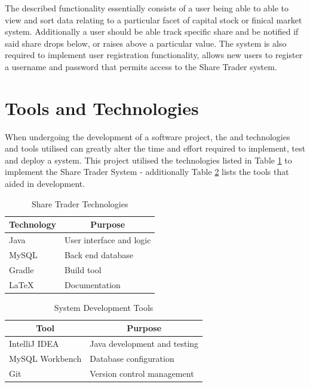 \documentclass[12pt, a4paper,titlepage]{article}
\begin{document}
The described functionality essentially consists of a user being able to
able to view and sort data relating to a particular facet of
capital stock or finical market system.
Additionally a user should be able track specific share and be notified if said
share drops below, or raises above a particular value.
The system is also required to implement user registration functionality,
allows new users to register a username and password that permits access to
the Share Trader system.


\section{Tools and Technologies}
When undergoing the development of a software project, the and technologies
and tools utilised can greatly alter the time and effort required to
implement, test and deploy a system.
This project utilised the technologies listed in Table \ref{table-tech} to
implement the Share Trader System - additionally Table \ref{table-tool} lists
the tools that aided in development.

\begin{table}[h]
    \centering
    \begin{tabular}{|l|l|}
        \hline
        \textbf{Technology}  & \multicolumn{1}{c|}{\textbf{Purpose}} \\ \hline
        Java        & User interface and logic     \\ \hline
        MySQL       & Back end database            \\ \hline
        Gradle      & Build tool                   \\ \hline
        \LaTeX      & Documentation                \\ \hline
    \end{tabular}
    \caption{Share Trader Technologies}
    \label{table-tech}
\end{table}

\begin{table}[h]
    \centering
    \begin{tabular}{|l|l|}
        \hline
        \multicolumn{1}{|c|}{\textbf{Tool}} &
        \multicolumn{1}{c|}{\textbf{Purpose}} \\ \hline
        IntelliJ IDEA                       & Java development and testing
        \\ \hline
        MySQL Workbench                     & Database configuration
        \\ \hline
        Git                                 & Version control management
        \\ \hline
    \end{tabular}
    \caption{System Development Tools}
    \label{table-tool}
\end{table}
\end{document}
